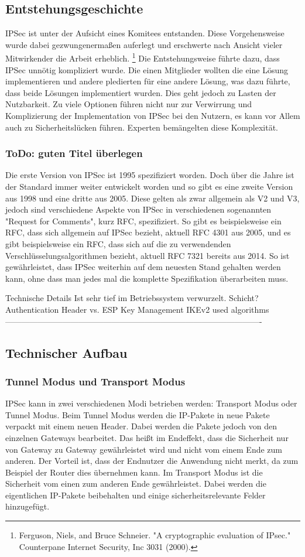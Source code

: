 \documentclass[12pt]{scrartcl}
\begin{document}
\subsection{Entstehungsgeschichte}
IPSec ist unter der Aufsicht eines Komitees entstanden. Diese Vorgehensweise wurde dabei gezwungenermaßen auferlegt und erschwerte nach Ansicht vieler Mitwirkender die Arbeit erheblich. \footnote{Ferguson, Niels, and Bruce Schneier. "A cryptographic evaluation of IPsec." Counterpane Internet Security, Inc 3031 (2000).} 
Die Entstehungsweise führte dazu, dass IPSec unnötig kompliziert wurde. Die einen Mitglieder wollten die eine Lösung implementieren und andere pledierten für eine andere Lösung, was dazu führte, dass beide Lösungen implementiert wurden. Dies geht jedoch zu Lasten der Nutzbarkeit. Zu viele Optionen führen nicht nur zur Verwirrung und Komplizierung der Implementation von IPSec bei den Nutzern, es kann vor Allem auch zu Sicherheitslücken führen. Experten bemängelten diese Komplexität.

\subsubsection{ToDo: guten Titel überlegen}
Die erste Version von IPSec ist 1995 spezifiziert worden. Doch über die Jahre ist der Standard immer weiter entwickelt worden und so gibt es eine zweite Version aus 1998 und eine dritte aus 2005. Diese gelten als zwar allgemein als V2 und V3, jedoch sind verschiedene Aspekte von IPSec in verschiedenen sogenannten "Request for Comments", kurz RFC, spezifiziert. So gibt es beispielsweise ein RFC, dass sich allgemein auf IPSec bezieht, aktuell RFC 4301 aus 2005, und es gibt beispielsweise ein RFC, dass sich auf die zu verwendenden Verschlüsselungsalgorithmen bezieht, aktuell RFC 7321 bereits aus 2014. So ist gewährleistet, dass IPSec weiterhin auf dem neuesten Stand gehalten werden kann, ohne dass man jedes mal die komplette Spezifikation überarbeiten muss.

Technische Details
Ist sehr tief im Betriebssystem verwurzelt. 
Schicht?
Authentication Header vs. ESP
Key Management IKEv2
used algorithms
----------------------------------------------------------------------------------------------
\subsection{Technischer Aufbau}
\subsubsection{Tunnel Modus und Transport Modus}
IPSec kann in zwei verschiedenen Modi betrieben werden: Transport Modus oder Tunnel Modus. 
Beim Tunnel Modus werden die IP-Pakete in neue Pakete verpackt mit einem neuen Header. Dabei werden die Pakete jedoch von den einzelnen Gateways bearbeitet. Das heißt im Endeffekt, dass die Sicherheit nur von Gateway zu Gateway gewährleistet wird und nicht vom einem Ende zum anderen. Der Vorteil ist, dass der Endnutzer die Anwendung nicht merkt, da zum Beispiel der Router dies übernehmen kann. 
Im Transport Modus ist die Sicherheit vom einen zum anderen Ende gewährleistet. Dabei werden die eigentlichen IP-Pakete beibehalten und einige sicherheitsrelevante Felder hinzugefügt.
\end{document}
